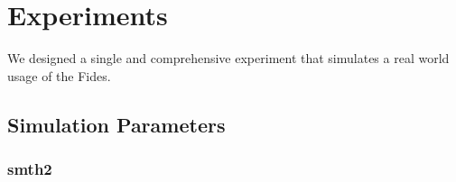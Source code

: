 \chapter{Experiments}
\label{chap:experiments}

We designed a single and comprehensive experiment that simulates a real world usage of the Fides. 


\section{Simulation Parameters}


\subsection{smth2}